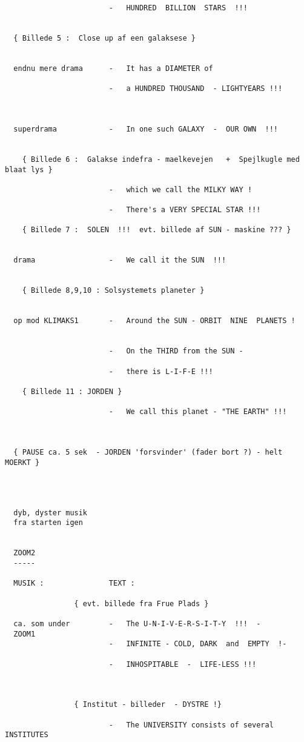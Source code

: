 \documentclass[a4paper,11pt]{article}
\begin{document}
\begin{sketch}
\begin{verbatim}
                        -   HUNDRED  BILLION  STARS  !!!


  { Billede 5 :  Close up af een galaksese }


  endnu mere drama      -   It has a DIAMETER of 

                        -   a HUNDRED THOUSAND  - LIGHTYEARS !!!


  
  superdrama            -   In one such GALAXY  -  OUR OWN  !!!


    { Billede 6 :  Galakse indefra - maelkevejen   +  Spejlkugle med blaat lys }

                        -   which we call the MILKY WAY !

                        -   There's a VERY SPECIAL STAR !!!

    { Billede 7 :  SOLEN  !!!  evt. billede af SUN - maskine ??? }


  drama                 -   We call it the SUN  !!!


    { Billede 8,9,10 : Solsystemets planeter }


  op mod KLIMAKS1       -   Around the SUN - ORBIT  NINE  PLANETS !


                        -   On the THIRD from the SUN -

                        -   there is L-I-F-E !!!

    { Billede 11 : JORDEN }

                        -   We call this planet - "THE EARTH" !!!

  

  { PAUSE ca. 5 sek  - JORDEN 'forsvinder' (fader bort ?) - helt MOERKT }




  dyb, dyster musik 
  fra starten igen


  ZOOM2
  -----

  MUSIK :               TEXT :

                { evt. billede fra Frue Plads }

  ca. som under         -   The U-N-I-V-E-R-S-I-T-Y  !!!  -
  ZOOM1
                        -   INFINITE - COLD, DARK  and  EMPTY  !-

                        -   INHOSPITABLE  -  LIFE-LESS !!!



                { Institut - billeder  - DYSTRE !}

                        -   The UNIVERSITY consists of several INSTITUTES


\end{verbatim}
\end{sketch}
\end{document}
